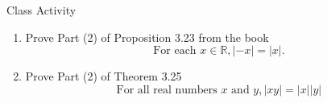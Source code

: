 \documentclass{beamer}
\begin{document}
\begin{frame}{Class Activity}
    \begin{enumerate}
        \item Prove Part (2) of Proposition 3.23 from the book
        \[ \text{For each } x \in \mathbb{R}, |-x| = |x|. \]
        \item Prove Part (2) of Theorem 3.25
        \[ \text{For all real numbers } x \text{ and } y, |xy| = |x| |y| \]
    \end{enumerate}
\end{frame}
\end{document}
